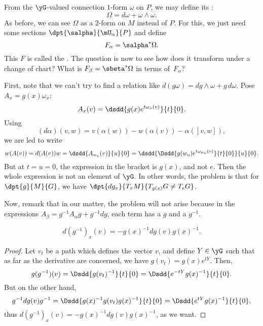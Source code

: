 From the $\yG$-valued connection $1$-form $\omega$ on $P$, we may define its :
\begin{equation}
	\Omega=d\omega+\omega\wedge\omega.
\end{equation}
As before, we can see $\Omega$ as a $2$-form on $M$ instead of $P$. For this, we just need some sections $\dpt{\salpha}{\mU_{\alpha}}{P}$ and define
\begin{equation}
	F_{\alpha}=\salpha^*\Omega.
\end{equation}
This $F$ is called the . The question is now to see how does it transform under a change of chart? What is $F_{\beta}=\sbeta^*\Omega$ in terms of~$F_{\alpha}$?

First, note that we can't try to find a relation like $d(g\omega)=dg\wedge\omega+g\,d\omega$. Pose $A_x=g(x)\omega_x$:
\[
	A_x(v)=\dsdd{g(x)e^{t\omega_x(v)}}{t}{0}.
\]
Using
\[
	(d\alpha)(v,w)=v(\alpha(w))-w(\alpha(v))-\alpha([v,w]),
\]
we are led to write
\begin{equation}
	w(A(v))=d(A(v))w
	=\dsdd{A_{w_u}(v)}{u}{0}
	=\dsdd{ \Dsdd{g(w_u)e^{t\omega_{w_u}(v)}}{t}{0} }{u}{0}.
\end{equation}
But at $t=u=0$, the expression in the bracket is $g(x)$, and not $e$. Then the whole expression is not an element of $\yG$. In other words, the problem is that for $\dpt{g}{M}{G}$, we have $\dpt{dg_x}{T_xM}{T_{g(x)}G\neq T_eG}$.

Now, remark that in our matter, the problem will not arise because in the expressions $A_{\beta}=g^{-1} A_{\alpha} g+g^{-1} dg$, each term has a $g$ and a $g^{-1}$.

\begin{lemma}
	\begin{equation}
		d(g^{-1})_x(v)=-g(x)^{-1} dg(v)g(x)^{-1}.
	\end{equation}
	\label{lem:dgemu}
\end{lemma}

\begin{proof}
	Let $v_t$ be a path which defines the vector $v$, and define $Y\in\yG$ such that as far as the derivative are concerned, we have $g(v_t)=g(x)e^{tY}$. Then,
	\[
		g(g^{-1})(v)=\Dsdd{g(v_t)^{-1}}{t}{0}=\Dsdd{e^{-tY}g(x)^{-1}}{t}{0}.
	\]
	But on the other hand,
	\[
		g^{-1} dg(v)g^{-1}=\Dsdd{g(x)^{-1} g(v_t)g(x)^{-1}}{t}{0}=\Dsdd{e^{tY}g(x)^{-1}}{t}{0},
	\]
	thus $d(g^{-1})_x(v)=-g(x)^{-1} dg(v)g(x)^{-1}$, as we want.
\end{proof}

